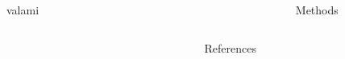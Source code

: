 \documentclass[final]{beamer}
\newlength{\onecolwid}
\newlength{\twocolwid}
\begin{document}
\begin{frame}[t]
\begin{columns}[t]
\begin{column}{\twocolwid}
\begin{column}{\twocolwid}
\begin{block}{valami}

\end{block}
\end{column}

\end{column}


\begin{column}{\twocolwid} %

\begin{columns}[t,totalwidth=\twocolwid] %

\begin{column}{\onecolwid}\vspace{-.6in} %







  
\end{column} %


\begin{column}{\onecolwid}\vspace{-.6in} %



  
\begin{block}{Methods}
\end{block}


\end{column} %

\end{columns} %

\begin{column}{\twocolwid}
\begin{block}{References}


\printbibliography
\end{block}
\end{column}


\end{column} %

\end{columns} %

\end{frame} %
\end{document}
